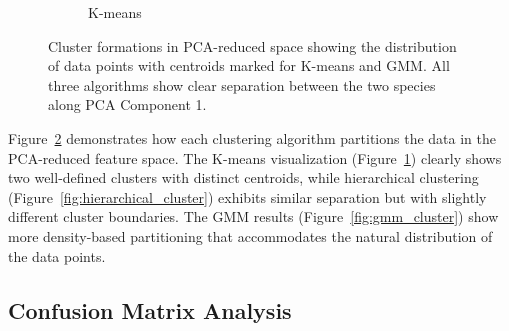 \documentclass[a4paper,12pt]{report}
\begin{document}
\begin{figure}[H]
\begin{subfigure}[b]{0.32\textwidth}
        \caption{K-means}
        \label{fig:kmeans_cluster}
    \end{subfigure}
    \caption{Cluster formations in PCA-reduced space showing the distribution of data points with centroids marked for K-means and GMM. All three algorithms show clear separation between the two species along PCA Component 1.}
    \label{fig:cluster_visualizations}
\end{figure}

Figure~\ref{fig:cluster_visualizations} demonstrates how each clustering algorithm partitions the data in the PCA-reduced feature space. The K-means visualization (Figure~\ref{fig:kmeans_cluster}) clearly shows two well-defined clusters with distinct centroids, while hierarchical clustering (Figure~\ref{fig:hierarchical_cluster}) exhibits similar separation but with slightly different cluster boundaries. The GMM results (Figure~\ref{fig:gmm_cluster}) show more density-based partitioning that accommodates the natural distribution of the data points.

\subsection{Confusion Matrix Analysis}
\end{document}
